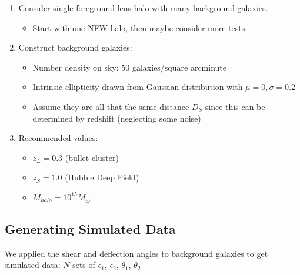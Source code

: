 \documentclass[10pt]{article}
\begin{document}
\begin{enumerate}
    \item Consider single foreground lens halo with many background galaxies.
    \begin{itemize}
        \item Start with one NFW halo, then maybe consider more tests.
    \end{itemize}
    \item Construct background galaxies:
    \begin{itemize}
        \item Number density on sky: 50 galaxies/square arcminute
        \item Intrinsic ellipticity drawn from Gaussian distribution with $\mu=0, \sigma=0.2$
        \item Assume they are all that the same distance $D_S$ since this can be determined by redshift (neglecting some noise)
    \end{itemize}
    \item Recommended values:
    \begin{itemize}
        \item $z_L = 0.3$ (bullet cluster)
        \item $z_S = 1.0$ (Hubble Deep Field)
        \item $M_{halo} = 10^{15} M_\odot$
    \end{itemize}
\end{enumerate}

\subsection{Generating Simulated Data}
We applied the shear and deflection angles to background galaxies to get simulated data: $N$ sets of $\epsilon_1$, $\epsilon_2$, $\theta_1$, $\theta_2$
\end{document}
